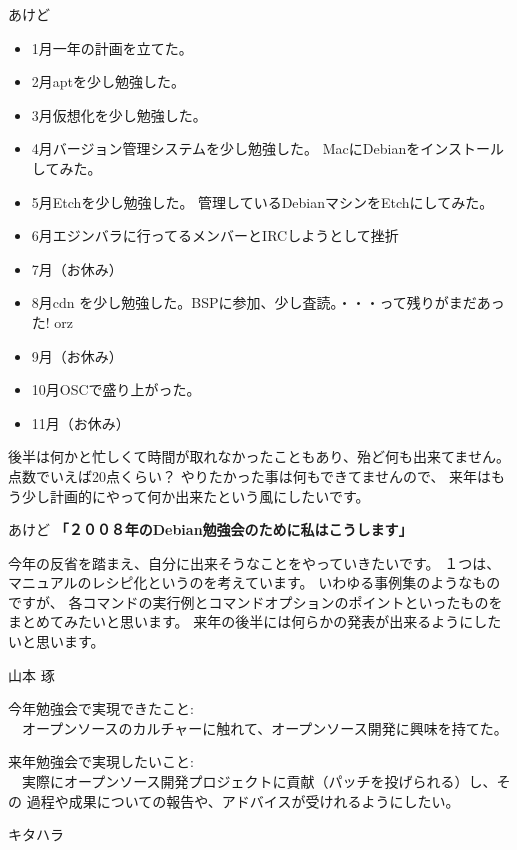 \documentclass[cjk,dvipdfmx,12pt]{beamer}
\begin{document}
\begin{frame}{あけど}
{\scriptsize
 \begin{itemize}
 \item  1月一年の計画を立てた。
 \item  2月aptを少し勉強した。
 \item  3月仮想化を少し勉強した。
 \item  4月バージョン管理システムを少し勉強した。 MacにDebianをインストールしてみた。
 \item  5月Etchを少し勉強した。 管理しているDebianマシンをEtchにしてみた。
 \item  6月エジンバラに行ってるメンバーとIRCしようとして挫折
 \item  7月（お休み）
 \item  8月cdn を少し勉強した。BSPに参加、少し査読。・・・って残りがまだあった! orz
 \item  9月（お休み）
 \item  10月OSCで盛り上がった。
 \item  11月（お休み）
 \end{itemize}
}
後半は何かと忙しくて時間が取れなかったこともあり、殆ど何も出来てません。
点数でいえば20点くらい？
やりたかった事は何もできてませんので、
来年はもう少し計画的にやって何か出来たという風にしたいです。

\end{frame}\begin{frame}{あけど}
\textbf{「２００８年のDebian勉強会のために私はこうします」}

今年の反省を踏まえ、自分に出来そうなことをやっていきたいです。
１つは、マニュアルのレシピ化というのを考えています。
いわゆる事例集のようなものですが、
各コマンドの実行例とコマンドオプションのポイントといったものを
まとめてみたいと思います。
来年の後半には何らかの発表が出来るようにしたいと思います。

\end{frame}\begin{frame}{山本 琢}

今年勉強会で実現できたこと:\\
　オープンソースのカルチャーに触れて、オープンソース開発に興味を持てた。

来年勉強会で実現したいこと:\\
　実際にオープンソース開発プロジェクトに貢献（パッチを投げられる）し、その
過程や成果についての報告や、アドバイスが受けれるようにしたい。

\end{frame}\begin{frame}{キタハラ}


\end{frame}
\end{document}
